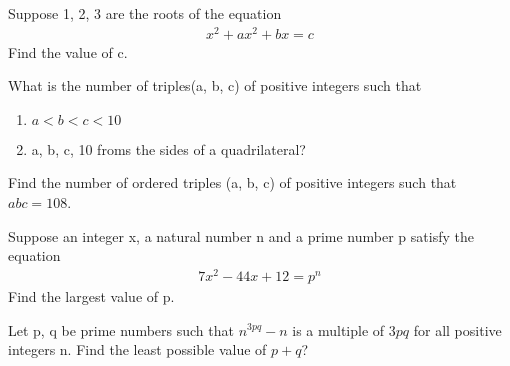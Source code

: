 \item Suppose 1, 2, 3 are the roots of the equation
\begin{align}
x^2 + ax^2 + bx = c
\end{align}
Find the value of c.

\item What is the number of triples(a, b, c) of positive integers such that
\begin{enumerate}
\item $a < b < c < 10$
\item a, b, c, 10 froms the sides of a quadrilateral?
\end{enumerate}

\item Find the number of ordered triples (a, b, c) of positive integers such that $abc = 108$.

\item Suppose an integer x, a natural number n and a prime number p satisfy the equation
\begin{align}
7x^2 - 44x + 12 = p^n
\end{align}
Find the largest value of p.

\item Let p, q be prime numbers such that $n^{3pq} - n$ is a multiple of $3pq$ for all positive integers n. Find the least possible value of $p + q$?










































